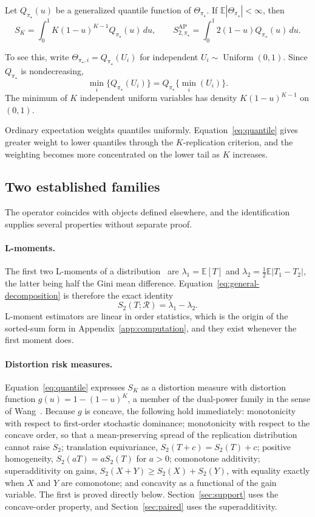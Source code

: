 \documentclass[11pt]{article}
\newcommand{\Regime}{\mathcal{R}}
\newcommand{\E}{\mathbb{E}}
\newcommand{\SAP}{S_{2,\pi_\star}^{\mathrm{AP}}}
\theoremstyle{remark}
\begin{document}
Let $Q_{\pi_\star}(u)$ be a generalized quantile function of $\Theta_{\pi_\star}$. If $\E|\Theta_{\pi_\star}|<\infty$, then
\begin{equation}
S_K
=
\int_0^1 K(1-u)^{K-1}Q_{\pi_\star}(u)\,du,
\qquad
\SAP
=
\int_0^1 2(1-u)Q_{\pi_\star}(u)\,du.
\label{eq:quantile}
\end{equation}

To see this, write $\Theta_{\pi_\star,i}=Q_{\pi_\star}(U_i)$ for independent $U_i\sim\operatorname{Uniform}(0,1)$. Since $Q_{\pi_\star}$ is nondecreasing,
\[
\min_i\{Q_{\pi_\star}(U_i)\}
=
Q_{\pi_\star}\{\min_i(U_i)\}.
\]
The minimum of $K$ independent uniform variables has density $K(1-u)^{K-1}$ on $(0,1)$.

Ordinary expectation weights quantiles uniformly. Equation~\eqref{eq:quantile} gives greater weight to lower quantiles through the $K$-replication criterion, and the weighting becomes more concentrated on the lower tail as $K$ increases.

\subsection{Two established families}
\label{app:families}

The operator coincides with objects defined elsewhere, and the identification supplies several properties without separate proof.

\paragraph{L-moments.}
The first two L-moments of a distribution~\cite{hosking1990lmoments} are $\lambda_1=\E[T]$ and $\lambda_2=\tfrac12\E|T_1-T_2|$, the latter being half the Gini mean difference. Equation~\eqref{eq:general-decomposition} is therefore the exact identity
\[
S_2(T;\Regime)=\lambda_1-\lambda_2 .
\]
L-moment estimators are linear in order statistics, which is the origin of the sorted-sum form in Appendix~\ref{app:computation}, and they exist whenever the first moment does.

\paragraph{Distortion risk measures.}
Equation~\eqref{eq:quantile} expresses $S_K$ as a distortion measure with distortion function $g(u)=1-(1-u)^{K}$, a member of the dual-power family in the sense of Wang~\cite{wang1996premium}. Because $g$ is concave, the following hold immediately: monotonicity with respect to first-order stochastic dominance; monotonicity with respect to the concave order, so that a mean-preserving spread of the replication distribution cannot raise $S_2$; translation equivariance, $S_2(T+c)=S_2(T)+c$; positive homogeneity, $S_2(aT)=aS_2(T)$ for $a>0$; comonotone additivity; superadditivity on gains, $S_2(X+Y)\geq S_2(X)+S_2(Y)$, with equality exactly when $X$ and $Y$ are comonotone; and concavity as a functional of the gain variable. The first is proved directly below. Section~\ref{sec:support} uses the concave-order property, and Section~\ref{sec:paired} uses the superadditivity.
\end{document}
